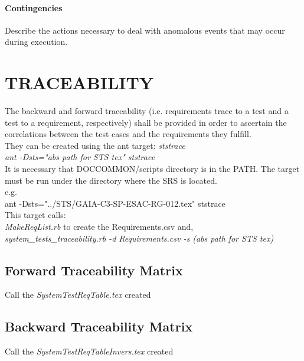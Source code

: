 \documentclass[CUx,lsstdraft,STS]{lsstdoc}
\begin{document}
\paragraph{Contingencies \label{sect:proc_contingencies}}
Describe the actions necessary to deal with anomalous events that may occur during execution.


\newpage

\appendix
\section{TRACEABILITY \label{sect:traceability}}
The backward and forward traceability (i.e. requirements trace to a test and a test to a requirement, respectively) shall be provided in order to 
ascertain the correlations between the test cases and the requirements they fulfill.\\ 
They can be created using the ant target: {\it ststrace}\\
{\it ant -Dsts="abs path for STS tex" ststrace}\\
It is necessary that DOCCOMMON/scripts directory is in the PATH. The target must be run under the directory where the SRS is located.\\

e.g.\\
ant -Dsts="../STS/GAIA-C3-SP-ESAC-RG-012.tex" ststrace \\
This target calls:\\
{\it MakeReqList.rb} to create the Requirements.csv and,\\
{\it system\_tests\_traceability.rb -d Requirements.csv -s (abs path for STS tex)}

\subsection{Forward Traceability Matrix}
Call the {\it SystemTestReqTable.tex} created

\subsection{Backward Traceability Matrix} 
Call the {\it SystemTestReqTableInvers.tex} created
\end{document}
